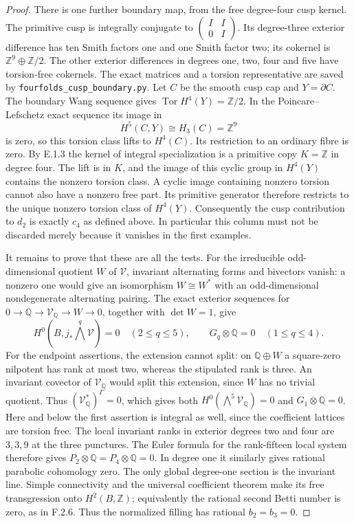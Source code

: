\begin{proof}
There is one further boundary map, from the free
degree-four cusp kernel.
The primitive cusp is integrally conjugate to
$\left(\begin{smallmatrix}I&I\\0&I\end{smallmatrix}\right)$.
Its degree-three exterior difference has ten Smith
factors one and one Smith factor two; its cokernel is
$\mathbb Z^9\oplus\mathbb Z/2$.
The other exterior differences in degrees one, two,
four and five have torsion-free cokernels.
The exact matrices and a torsion representative are
saved by \texttt{fourfolds\_cusp\_boundary.py}.
Let $C$ be the smooth cusp cap and $Y=\partial C$.
The boundary Wang sequence gives
$\operatorname{Tor}H^4(Y)=\mathbb Z/2$.
In the Poincare--Lefschetz exact sequence its image in
\[
 H^5(C,Y)\cong H_3(C)=\mathbb Z^9
\]
is zero, so this torsion class lifts to $H^4(C)$.
Its restriction to an ordinary fibre is zero.
By E.1.3 the kernel of integral specialization is
a primitive copy $K=\mathbb Z$ in degree four.
The lift is in $K$, and the image of this cyclic group
in $H^4(Y)$ contains the nonzero torsion class.
A cyclic image containing nonzero torsion cannot
also have a nonzero free part.
Its primitive generator therefore restricts to the
unique nonzero torsion class of $H^4(Y)$.
Consequently the cusp contribution to $d_2$ is
exactly $c_4$ as defined above.  In particular this
column must not be discarded merely because it
vanishes in the first examples.

It remains to prove that these are all the tests.
For the irreducible odd-dimensional quotient $W$
of $\mathcal V$, invariant alternating forms and
bivectors vanish: a nonzero one would give an
isomorphism $W\cong W^*$ with an odd-dimensional
nondegenerate alternating pairing.
The exact exterior sequences for
$0\to\mathbb Q\to\mathcal V_{\mathbb Q}\to W\to0$,
together with $\det W=1$, give
\[
 H^0(B,j_*\bigwedge^q\mathcal V)=0
       \quad(2\le q\le5),\qquad
 G_q\otimes\mathbb Q=0\quad(1\le q\le4).
 \tag{F.HC8}
\]
For the endpoint assertions, the extension cannot split:
on $\mathbb Q\oplus W$ a square-zero nilpotent has rank at
most two, whereas the stipulated rank is three.
An invariant covector of $\mathcal V_{\mathbb Q}$ would
split this extension, since $W$ has no trivial quotient.
Thus $(\mathcal V_{\mathbb Q}^*)^\Gamma=0$, which gives
both $H^0(\bigwedge^5\mathcal V_{\mathbb Q})=0$ and
$G_1\otimes\mathbb Q=0$.
Here and below the first assertion is integral as well,
since the coefficient lattices are torsion free.
The local invariant ranks in exterior degrees two
and four are $3,3,9$ at the three punctures.
The Euler formula for the rank-fifteen local system
therefore gives $P_2\otimes\mathbb Q=P_4\otimes\mathbb Q=0$.
In degree one it similarly gives rational parabolic
cohomology zero.
The only global degree-one section is the invariant
line.  Simple connectivity and the universal
coefficient theorem make its free transgression
onto $H^2(B,\mathbb Z)$; equivalently the rational
second Betti number is zero, as in F.2.6.
Thus the normalized filling has rational $b_2=b_3=0$.


\end{proof}
